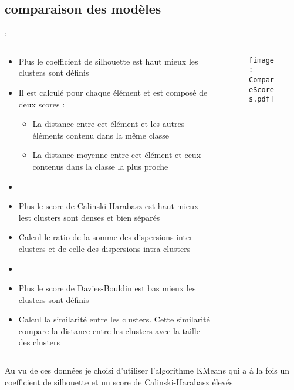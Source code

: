 \documentclass[8pt,aspectratio=169,hyperref={unicode=true}]{beamer}
\begin{document}
\subsection{comparaison des modèles}
\begin{frame}{\insertsection: \insertsubsection}
    \begin{columns}
        \begin{column}{.6\textwidth}
            \begin{itemize}
                \item Plus le coefficient de silhouette est haut mieux les clusters sont définis
                \item Il est calculé pour chaque élément et est composé de deux scores :
                      \begin{itemize}
                          \item La distance entre cet élément et les autres éléments contenu dans la même classe
                          \item La distance moyenne entre cet élément et ceux contenus dans la classe la plus proche
                      \end{itemize}
                \item[]
                \item Plus le score de Calinski-Harabasz est haut mieux lest clusters sont denses et bien séparés
                \item Calcul le ratio de la somme des dispersions inter-clusters et de celle des dispersions intra-clusters
                \item[]
                \item Plus le score de Davies-Bouldin est bas mieux les clusters sont définis
                \item Calcul la similarité entre les clusters. Cette similarité compare la distance entre les clusters avec la taille des clusters
            \end{itemize}
        \end{column}
        \begin{column}{.4\textwidth}
            \begin{figure}
                \texttt{[image: CompareScores.pdf]}
            \end{figure}
        \end{column}
    \end{columns}
    \vspace{.5cm}
    Au vu de ces données je choisi d'utiliser l'algorithme KMeans qui a à la fois un coefficient de silhouette et un score de Calinski-Harabasz élevés
\end{frame}
\end{document}
